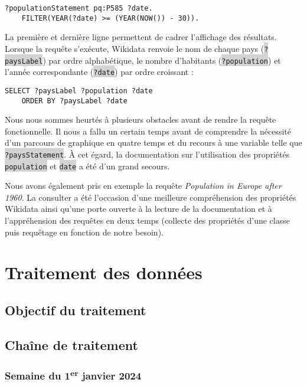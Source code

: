 \documentclass[hidelinks, 12pt]{article}
\newcommand{\code}[1]{\colorbox{LightGray}{\texttt{#1}}}
\begin{document}
\begin{lstlisting}[language=SPARQL]
	?populationStatement pq:P585 ?date.
	FILTER(YEAR(?date) >= (YEAR(NOW()) - 30)).
\end{lstlisting}

La première et dernière ligne permettent de cadrer l'affichage des résultats. Lorsque la requête s'exécute, Wikidata renvoie le nom de chaque pays (\code{?paysLabel}) par ordre alphabétique, le nombre d'habitants (\code{?population}) et l'année correspondante (\code{?date}) par ordre croissant :

\begin{lstlisting}[language=SPARQL]
	SELECT ?paysLabel ?population ?date
	ORDER BY ?paysLabel ?date
\end{lstlisting}

Nous nous sommes heurtés à plusieurs obstacles avant de rendre la requête fonctionnelle. Il nous a fallu un certain temps avant de comprendre la nécessité d'un parcours de graphique en quatre temps et du recours à une variable telle que \code{?paysStatement}. À cet égard, la documentation sur l'utilisation des propriétés \code{population}\autocite{wikipop} et \code{date}\autocite{wikidate} a été d'un grand secours. 

Nous avons également pris en exemple la requête \emph{Population in Europe after 1960}\autocite{wiki1960}. La consulter a été l'occasion d'une meilleure compréhension des propriétés Wikidata ainsi qu'une porte ouverte à la lecture de la documentation et à l'appréhension des requêtes en deux temps (collecte des propriétés d'une classe puis requêtage en fonction de notre besoin).


\section{Traitement des données}
	
\subsection{Objectif du traitement}
		
\subsection{Chaîne de traitement}

\subsubsection{Semaine du 1\textsuperscript{er} janvier 2024}
		
\end{document}
